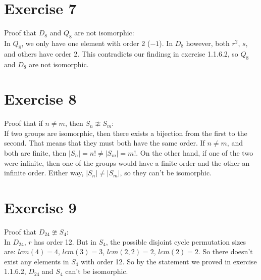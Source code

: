 \documentclass{article}
\begin{document}
    \section*{Exercise 7}
    Proof that $D_8$ and $Q_8$ are not isomorphic: \\
    In $Q_8$, we only have one element with order 2 ($-1$).
    In $D_8$ however, both $r^2$, $s$, and others have order 2.
    This contradicts our findinsg in exercise 1.1.6.2,
    so $Q_8$ and $D_8$ are not isomorphic.


    \section*{Exercise 8}
    Proof that if $n \neq m$, then $S_n \ncong S_m$: \\
    If two groups are isomorphic,
    then there exists a bijection from the first to the second.
    That means that they must both have the same order.
    If $n \neq m$, and both are finite,
    then $|S_n| = n! \neq |S_m| = m!$. 
    On the other hand, if one of the two were infinite,
    then one of the groups would have a finite order and the other an
    infinite order.
    Either way, $|S_n| \neq |S_m|$,
    so they can't be isomorphic.


    \section*{Exercise 9}
    Proof that $D_{24} \ncong S_4$: \\
    In $D_{24}$, $r$ has order 12.
    But in $S_4$, the possible disjoint cycle permutation sizes are:
    $lcm(4) = 4$, $lcm(3) = 3$, $lcm(2, 2) = 2$, $lcm(2) = 2$.
    So there doesn't exist any elements in $S_4$ with order 12.
    So by the statement we proved in exercise 1.1.6.2,
    $D_{24}$ and $S_4$ can't be isomorphic.
\end{document}

